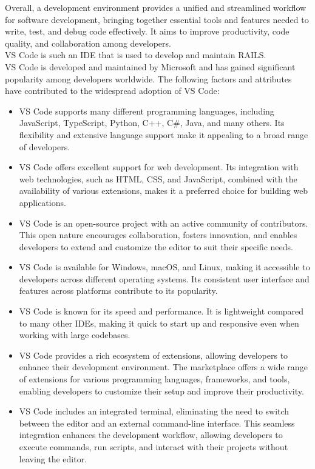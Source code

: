 Overall, a development environment provides a unified and streamlined workflow for software development, bringing together essential tools and features needed to write, test, and debug code effectively. It aims to improve productivity, code quality, and collaboration among developers.\vspace{5mm} \\
\ac{VS Code} is such an \ac{IDE} that is used to develop and maintain \ac{RAILS}.\vspace{5mm} \\
\ac{VS Code} is developed and maintained by Microsoft and has gained significant popularity among developers worldwide. The following factors and attributes have contributed to the widespread adoption of \ac{VS Code}:
\begin{itemize}
  \item \ac{VS Code} supports many different programming languages, including JavaScript, TypeScript, Python, C++, C\#, Java, and many others. Its flexibility and extensive language support make it appealing to a broad range of developers.
  \item \ac{VS Code} offers excellent support for web development. Its integration with web technologies, such as HTML, CSS, and JavaScript, combined with the availability of various extensions, makes it a preferred choice for building web applications.
  \item \ac{VS Code} is an open-source project with an active community of contributors. This open nature encourages collaboration, fosters innovation, and enables developers to extend and customize the editor to suit their specific needs.
  \item \ac{VS Code} is available for Windows, macOS, and Linux, making it accessible to developers across different operating systems. Its consistent user interface and features across platforms contribute to its popularity.
  \item \ac{VS Code} is known for its speed and performance. It is lightweight compared to many other \acp{IDE}, making it quick to start up and responsive even when working with large codebases.
  \item \ac{VS Code} provides a rich ecosystem of extensions, allowing developers to enhance their development environment. The marketplace offers a wide range of extensions for various programming languages, frameworks, and tools, enabling developers to customize their setup and improve their productivity.
  \item \ac{VS Code} includes an integrated terminal, eliminating the need to switch between the editor and an external command-line interface. This seamless integration enhances the development workflow, allowing developers to execute commands, run scripts, and interact with their projects without leaving the editor.

\end{itemize}
